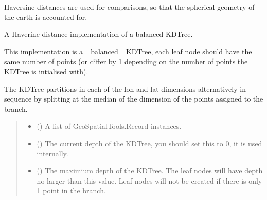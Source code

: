 \documentclass[letterpaper,10pt,english]{sphinxmanual}
\begin{document}
\sphinxAtStartPar
Haversine distances are used for comparisons, so that the spherical geometry
of the earth is accounted for.

\begin{fulllineitems}
\label{\detokenize{kdtree:GeoSpatialTools.kdtree.KDTree}}
\pysigstartsignatures
\pysiglinewithargsret
{}
{\sphinxparamcomma {}\sphinxparamcomma {}}
{}
\pysigstopsignatures
\sphinxAtStartPar
A Haverine distance implementation of a balanced KDTree.

\sphinxAtStartPar
This implementation is a \_balanced\_ KDTree, each leaf node should have the
same number of points (or differ by 1 depending on the number of points
the KDTree is intialised with).

\sphinxAtStartPar
The KDTree partitions in each of the lon and lat dimensions alternatively
in sequence by splitting at the median of the dimension of the points
assigned to the branch.
\begin{quote}\begin{description}
\begin{itemize}
\item {} 
\sphinxAtStartPar
{} (\sphinxstyleliteralemphasis{\sphinxupquote{{[}}}{\hyperref[\detokenize{record:GeoSpatialTools.record.Record}]{\sphinxcrossref{\sphinxstyleliteralemphasis{\sphinxupquote{Record}}}}}\sphinxstyleliteralemphasis{\sphinxupquote{{]}}}) \textendash{} A list of GeoSpatialTools.Record instances.

\item {} 
\sphinxAtStartPar
{} () \textendash{} The current depth of the KDTree, you should set this to 0, it is used
internally.

\item {} 
\sphinxAtStartPar
{} () \textendash{} The maximium depth of the KDTree. The leaf nodes will have depth no
larger than this value. Leaf nodes will not be created if there is
only 1 point in the branch.


\end{itemize}
\end{description}
\end{quote}
\end{fulllineitems}
\end{document}
